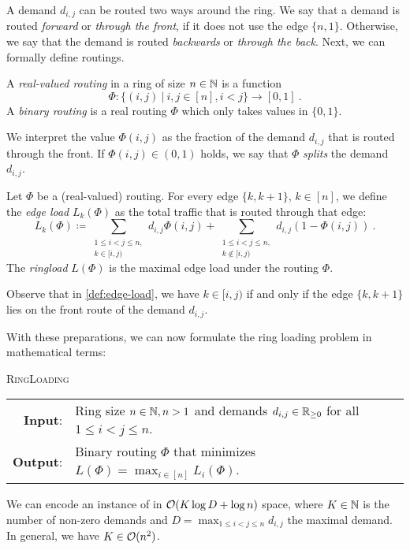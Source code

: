 A demand $d_{i, j}$ can be routed two ways around the ring.
We say that a demand is routed \emph{forward} or \emph{through the front}, if it does not use the edge $\{n, 1\}$.
Otherwise, we say that the demand is routed \emph{backwards} or \emph{through the back}.
Next, we can formally define routings.
\begin{definition}[Routing]
	\label{def:routing}
	A \emph{real-valued routing} in a ring of size $n \in \mathbb{N}$ is a function 
	\begin{equation}
		\Phi: \{(i, j)\ | \ i, j \in [n], i < j\} \rightarrow [0, 1] \ .
	\end{equation}
	A \emph{binary routing} is a real routing $\Phi$ which only takes values in $\{0, 1\}$. 
\end{definition}
We interpret the value $\Phi(i, j)$ as the fraction of the demand $d_{i, j}$ that is routed through the front.
If $\Phi(i, j) \in (0, 1)$ holds, we say that $\Phi$ \emph{splits} the demand $d_{i, j}$.

\begin{definition}
	\label{def:edge-load}
	Let $\Phi$ be a (real-valued) routing.
	For every edge $\{k, k+1\}$, $k \in [n]$, we define the \emph{edge load} $L_k(\Phi)$ as the total traffic that is routed through that edge:
	\begin{equation}
		\label{eq:edge-load}
		L_k(\Phi) \coloneqq \sum_{\substack{1 \leq i < j \leq n,\\ k \in [i, j)}} d_{i, j} \Phi(i, j) + \sum_{\substack{1 \leq i < j \leq n,\\ k \notin [i, j)}} d_{i, j} (1 - \Phi(i, j)) \ .
	\end{equation}
	The \emph{ringload} $L(\Phi)$ is the maximal edge load under the routing $\Phi$.
\end{definition}
Observe that in \cref{def:edge-load}, we have $k \in [i, j)$ if and only if the edge $\{k, k+1\}$ lies on the front route of the demand $d_{i, j}$.

With these preparations, we can now formulate the ring loading problem in mathematical terms:
\begin{center}
	\begin{mdframed}
		\centering
		\textsc{RingLoading}\\[0.7em]
		\begin{tabular}{rl}
			{\bfseries Input}: & Ring size $n \in \mathbb{N}, n > 1$ and demands $d_{i, j} \in \mathbb{R}_{\geq 0}$ for all $1 \leq i<j\leq n$.\\
			{\bfseries Output}: & Binary routing $\Phi$ that minimizes $L(\Phi) = \max_{i \in [n]} L_i(\Phi)$.
		\end{tabular}
	\end{mdframed}
\end{center}
We can encode an instance of \RL in $\mathcal{O}(K \log D + \log n)$ space, where $K \in \mathbb{N}$ is the number of non-zero demands and $D = \max_{1 \leq i < j \leq n}d_{i, j}$ the maximal demand.
In general, we have $K \in \mathcal{O}(n^2)$.


